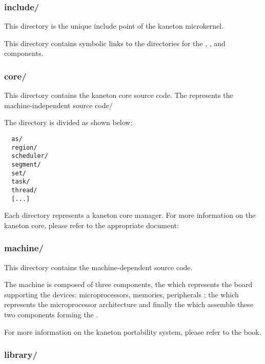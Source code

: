 
\subsubsection*{include/}

This directory is the unique include point of the kaneton microkernel.

This directory contains symbolic links to the  directories
for the , ,  and 
components.


\subsubsection*{core/}

This directory contains the kaneton core source code. The 
represents the machine-independent source code/

The directory is divided as shown below:

\begin{verbatim}
  as/
  region/
  scheduler/
  segment/
  set/
  task/
  thread/
  [...]
\end{verbatim}

Each directory represents a kaneton core manager. For more information on
the kaneton core, please refer to the appropriate document:


\subsubsection*{machine/}

This directory contains the machine-dependent source code.

The machine is composed of three components, the  which
represents the board supporting the devices: microprocessors, memories,
peripherals \etc{}; the  which represents the microprocessor
architecture and finally the  which assemble these two
components forming the .

For more information on the kaneton portability system, please refer to the
 book.


\subsubsection*{library/}

